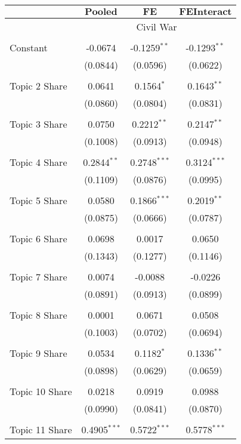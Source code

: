 \begin{center}
\begin{tabular}{lccc}
\\[-1.8ex]\hline
& $\textbf{Pooled}$& $\textbf{FE}$& $\textbf{FEInteract}$\\
 \hline \hline 
& \multicolumn{3}{c}{Civil War} \\
\hline \\[-1.8ex]
Constant & -0.0674 & -0.1259$^{**}$ & -0.1293$^{**}$ \\
 & (0.0844)& (0.0596)& (0.0622)\\ 
\\Topic 2 Share & 0.0641 & 0.1564$^{*}$ & 0.1643$^{**}$ \\
 & (0.0860)& (0.0804)& (0.0831)\\ 
\\Topic 3 Share & 0.0750 & 0.2212$^{**}$ & 0.2147$^{**}$ \\
 & (0.1008)& (0.0913)& (0.0948)\\ 
\\Topic 4 Share & 0.2844$^{**}$ & 0.2748$^{***}$ & 0.3124$^{***}$ \\
 & (0.1109)& (0.0876)& (0.0995)\\ 
\\Topic 5 Share & 0.0580 & 0.1866$^{***}$ & 0.2019$^{**}$ \\
 & (0.0875)& (0.0666)& (0.0787)\\ 
\\Topic 6 Share & 0.0698 & 0.0017 & 0.0650 \\
 & (0.1343)& (0.1277)& (0.1146)\\ 
\\Topic 7 Share & 0.0074 & -0.0088 & -0.0226 \\
 & (0.0891)& (0.0913)& (0.0899)\\ 
\\Topic 8 Share & 0.0001 & 0.0671 & 0.0508 \\
 & (0.1003)& (0.0702)& (0.0694)\\ 
\\Topic 9 Share & 0.0534 & 0.1182$^{*}$ & 0.1336$^{**}$ \\
 & (0.0898)& (0.0629)& (0.0659)\\ 
\\Topic 10 Share & 0.0218 & 0.0919 & 0.0988 \\
 & (0.0990)& (0.0841)& (0.0870)\\ 
\\Topic 11 Share & 0.4905$^{***}$ & 0.5722$^{***}$ & 0.5778$^{***}$ \\

\end{tabular}
\end{center}
